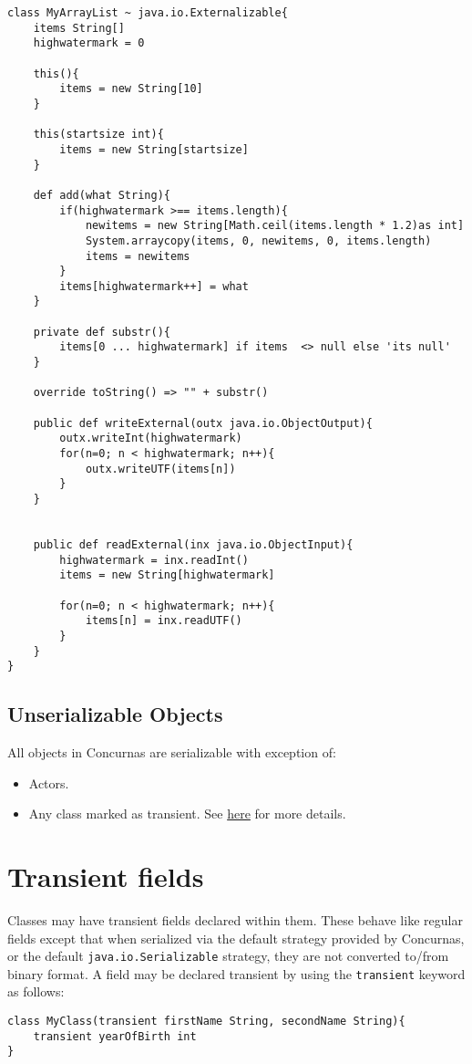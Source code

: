 \documentclass[conc-doc]{subfiles}
\begin{document}
\begin{lstlisting}
class MyArrayList ~ java.io.Externalizable{
	items String[]
	highwatermark = 0
	
	this(){
		items = new String[10]
	}
	
	this(startsize int){
		items = new String[startsize]
	}
	
	def add(what String){
		if(highwatermark >== items.length){
			newitems = new String[Math.ceil(items.length * 1.2)as int]
			System.arraycopy(items, 0, newitems, 0, items.length)
			items = newitems
		}
		items[highwatermark++] = what
	}
	
	private def substr(){
		items[0 ... highwatermark] if items  <> null else 'its null'
	}
	
	override toString() => "" + substr()
	
	public def writeExternal(outx java.io.ObjectOutput){
		outx.writeInt(highwatermark)
		for(n=0; n < highwatermark; n++){
			outx.writeUTF(items[n])
		}
	}
	
	
	public def readExternal(inx java.io.ObjectInput){
		highwatermark = inx.readInt()
		items = new String[highwatermark]
		
		for(n=0; n < highwatermark; n++){
			items[n] = inx.readUTF()
		}
	}
}
\end{lstlisting}


\subsection{Unserializable Objects}
All objects in Concurnas are serializable with exception of:
\begin{itemize}
	\item Actors.
	\item Any class marked as transient. See \hyperref[sec:transientClasses]{here} for more details.
\end{itemize} 

\section{Transient fields}
Classes may have transient fields declared within them. These behave like regular fields except that when serialized via the default strategy provided by Concurnas, or the default \lstinline{java.io.Serializable} strategy, they are not converted to/from binary format. A field may be declared transient by using the \lstinline{transient} keyword as follows:

\begin{lstlisting}
class MyClass(transient firstName String, secondName String){
	transient yearOfBirth int
}
\end{lstlisting}
\end{document}
